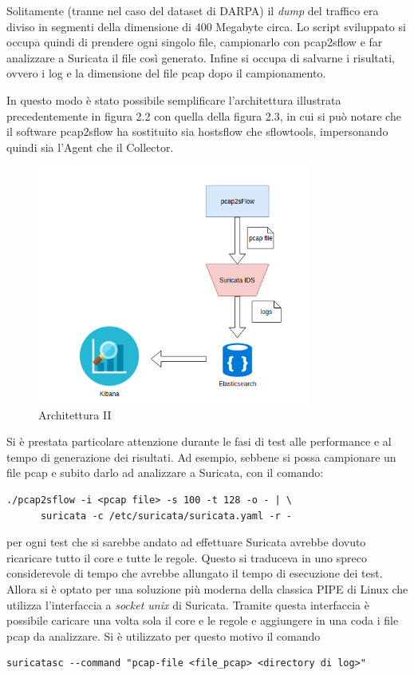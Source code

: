 \documentclass[12pt,a4paper,openright,twoside]{report}
\begin{document}
Solitamente (tranne nel caso del dataset di DARPA) il {\it dump} del traffico era
diviso in segmenti della dimensione di 400 Megabyte circa. Lo script sviluppato si
occupa quindi di prendere ogni singolo file, campionarlo con pcap2sflow e far analizzare
a Suricata il file cos\`i generato. Infine si occupa di salvarne i risultati, ovvero i log e la
dimensione del file pcap dopo il campionamento.

In questo modo \`e stato possibile semplificare l'architettura illustrata precedentemente
in figura 2.2 con quella della figura 2.3, in cui si pu\`o notare che il software
pcap2sflow ha sostituito sia hostsflow che sflowtools, impersonando quindi sia
l'Agent che il Collector.

\begin{figure}
  \begin{center}                          %
    \includegraphics[width=90mm]{images/arch-2.png}
    \caption{Architettura II}
    \label{}
  \end{center}
\end{figure}

Si \`e prestata particolare attenzione durante le fasi di test alle performance e
al tempo di generazione dei risultati. Ad esempio, sebbene si possa campionare un file
pcap e subito darlo ad analizzare a Suricata, con il comando:
\begin{verbatim}
./pcap2sflow -i <pcap file> -s 100 -t 128 -o - | \
      suricata -c /etc/suricata/suricata.yaml -r -
\end{verbatim}
per ogni test che si sarebbe andato ad effettuare Suricata avrebbe dovuto ricaricare
tutto il core e tutte le regole. Questo si traduceva in uno spreco considerevole di tempo
che avrebbe allungato il tempo di esecuzione dei test. Allora si \`e optato per una
soluzione pi\`u moderna della classica PIPE di Linux che utilizza l'interfaccia
a {\it socket unix} di Suricata. Tramite questa interfaccia \`e possibile caricare una
volta sola il core e le regole e aggiungere in una coda i file pcap da analizzare.
Si \`e utilizzato per questo motivo il comando
\begin{verbatim}
suricatasc --command "pcap-file <file_pcap> <directory di log>"
\end{verbatim}
\end{document}
